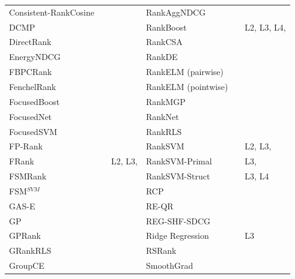 \documentclass{sig-alternate-2013}
\begin{document}
\begin{table}[!hp]
\begin{tabular}{lll|lll}
Consistent-RankCosine & \cite{Ravikumar2011} & \cite{Tan2013} & RankAggNDCG & \cite{Wang2013} & \cite{Wang2013} \\ 
DCMP & \cite{Renjifo2012}  & \cite{Renjifo2012}  & RankBoost & \cite{Freund2003} & L2, L3, L4, \cite{Busa-Fekete2013, Alcantara2010} \\ 
DirectRank & \cite{Tan2013} & \cite{Tan2013} & RankCSA & \cite{He2010} & \cite{He2010} \\ 
EnergyNDCG & \cite{Freno2011} & \cite{Freno2011} & RankDE & \cite{Bollegala2011} & \cite{Sato2013} \\ 
FBPCRank & \cite{Lai2011} & \cite{Lai2011} & RankELM (pairwise) & \cite{Zong2013} & \cite{Zong2013} \\ 
FenchelRank & \cite{Lai2013} & \cite{Lai2013, Lai2013b, Laporte2013} & RankELM (pointwise) & \cite{Zong2013} & \cite{Zong2013} \\ 
FocusedBoost & \cite{Niu2012} & \cite{Niu2012} & RankMGP & \cite{Lin2012} & \cite{Lin2012} \\ 
FocusedNet & \cite{Niu2012} & \cite{Niu2012} & RankNet & \cite{Burges2005} & \cite{Busa-Fekete2013, Papini2012, Niu2012} \\ 
FocusedSVM & \cite{Niu2012} & \cite{Niu2012} & RankRLS & \cite{Pahikkala2009} & \cite{Pahikkala2010} \\ 
FP-Rank & \cite{Song2013} & \cite{Song2013} & RankSVM & \cite{Herbrich1999, Joachims2002} & L2, L3, \cite{Busa-Fekete2013, Freno2011, He2010, Alcantara2010} \\ 
FRank & \cite{Tsai2007} & L2, L3, \cite{Wang2012} & RankSVM-Primal &  & L3, \cite{Lai2011} \\ 
FSMRank & \cite{Lai2013c} & \cite{Lai2013c,Laporte2013} & RankSVM-Struct &  & L3, L4 \\
FSM$^{SVM}$ & \cite{Lai2013c} & \cite{Lai2013c} & RCP & \cite{Elsas2008} & \cite{Elsas2008} \\ 
GAS-E & \cite{Geng2007} & \cite{Lai2013c} & RE-QR & \cite{Veloso2010} & \cite{Veloso2010} \\
GP & \cite{DeAlmeida2007} & \cite{Alcantara2010} & REG-SHF-SDCG & \cite{Wu2009} & \cite{Wu2009} \\  
GPRank & \cite{Silva2009} & \cite{Torkestani2012} & Ridge Regression & \cite{Cossock2006} & L3 \\
GRankRLS & \cite{Pahikkala2010} & \cite{Pahikkala2010} & RSRank & \cite{Sun2009} & \cite{Lai2013} \\ 
GroupCE & \cite{Lin2011} & \cite{Lin2011} & SmoothGrad & \cite{Le2007} & \cite{Tan2013} \\ 

\end{tabular}
\end{table}
\end{document}
